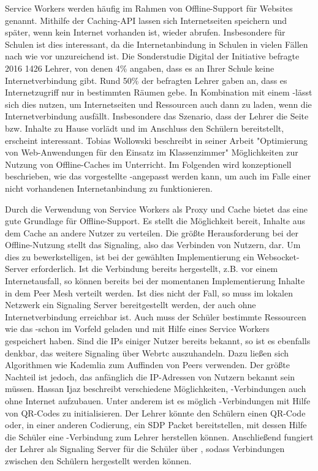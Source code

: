 Service Workers werden häufig im Rahmen von Offline-Support für Websites genannt. Mithilfe der Caching-API lassen sich Internetseiten speichern und später, wenn kein Internet vorhanden ist, wieder abrufen. Insbesondere für Schulen ist dies interessant, da die Internetanbindung in Schulen in vielen Fällen nach wie vor unzureichend ist. Die Sonderstudie Digital der Initiative befragte 2016 1426 Lehrer, von denen 4\% angaben, dass es an Ihrer Schule keine Internetverbindung gibt. Rund 50\% der befragten Lehrer gaben an, dass es Internetzugriff nur in bestimmten Räumen gebe.\cite{sonderstudie_digital} In Kombination mit einem \pTp-\cdn lässt sich dies nutzen, um Internetseiten und Ressourcen auch dann zu laden, wenn die Internetverbindung ausfällt. Insbesondere das Szenario, dass der Lehrer die Seite bzw. Inhalte zu Hause vorlädt und im Anschluss den Schülern bereitstellt, erscheint interessant. Tobias Wollowski beschreibt in seiner Arbeit "Optimierung von Web-Anwendungen für den Einsatz im Klassenzimmer"\cite{tobi} Möglichkeiten zur Nutzung von Offline-Caches im Unterricht. Im Folgenden wird konzeptionell beschrieben, wie das vorgestellte \pTp-\cdn angepasst werden kann, um auch im Falle einer nicht vorhandenen Internetanbindung zu funktionieren.

Durch die Verwendung von Service Workers als Proxy und Cache bietet das \cdn eine gute Grundlage für Offline-Support. Es stellt die Möglichkeit bereit, Inhalte aus dem Cache an andere Nutzer zu verteilen. Die größte Herausforderung bei der Offline-Nutzung stellt das Signaling, also das Verbinden von Nutzern, dar. Um dies zu bewerkstelligen, ist bei der gewählten Implementierung ein Websocket-Server erforderlich. Ist die Verbindung bereits hergestellt, z.B. vor einem Internetausfall, so können bereits bei der momentanen Implementierung Inhalte in dem Peer Mesh verteilt werden. Ist dies nicht der Fall, so muss im lokalen Netzwerk ein Signaling Server bereitgestellt werden, der auch ohne Internetverbindung erreichbar ist. Auch muss der Schüler bestimmte Ressourcen wie das \pTp-\cdn schon im Vorfeld geladen und mit Hilfe eines Service Workers gespeichert haben. Sind die IPs einiger Nutzer bereits bekannt, so ist es ebenfalls denkbar, das weitere Signaling über Webrtc auszuhandeln. Dazu ließen sich Algorithmen wie Kademlia zum Auffinden von Peers verwenden. Der größte Nachteil ist jedoch, das anfänglich die IP-Adressen von Nutzern bekannt sein müssen. Hassan Ijaz\cite{signaling_no_i_patent} beschreibt verschiedene Möglichkeiten, \webrtc-Verbindungen auch ohne Internet aufzubauen. Unter anderem ist es möglich \webrtc-Verbindungen mit Hilfe von QR-Codes zu initialisieren. Der Lehrer könnte den Schülern einen QR-Code oder, in einer anderen Codierung, ein SDP Packet bereitstellen, mit dessen Hilfe die Schüler eine \webrtc-Verbindung zum Lehrer herstellen können. Anschließend fungiert der Lehrer als Signaling Server für die Schüler über \webrtc, sodass Verbindungen zwischen den Schülern hergestellt werden können.

